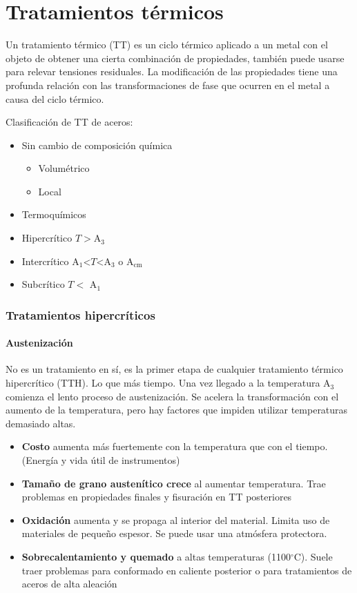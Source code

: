 \documentclass{article}
\newcommand{\Aone}{A\ensuremath{_{1}}}
\newcommand{\Athree}{A\ensuremath{_{3}}}
\newcommand{\Acm}{A\ensuremath{_{\mathrm{cm}}}}
\newcommand{\grad}{\ensuremath{^\circ \mathrm{C}}}
\begin{document}
\part{Tratamientos térmicos}
Un tratamiento térmico (TT) es un ciclo térmico aplicado a un metal con el objeto de obtener una cierta combinación de propiedades, también puede usarse para relevar tensiones residuales. La modificación de las propiedades tiene una profunda relación con las transformaciones de fase que ocurren en el metal a causa del ciclo térmico.

Clasificación de TT de aceros:
\begin{itemize}
    \item Sin cambio de composición química
    \begin{itemize}
        \item Volumétrico
        \item Local
    \end{itemize}
    \item Termoquímicos
    \item Hipercrítico $T>$\Athree
    \item Intercrítico \Aone<$T$<\Athree{} o \Acm
    \item Subcrítico $T<$ \Aone
\end{itemize}

\section{Tratamientos hipercríticos}

\subsection{Austenización}
No es un tratamiento en sí, es la primer etapa de cualquier tratamiento térmico hipercrítico (TTH). Lo que más tiempo. Una vez llegado a la temperatura \Athree{} comienza el lento proceso de austenización. Se acelera la transformación con el aumento de la temperatura, pero hay factores que impiden utilizar temperaturas demasiado altas.

\begin{itemize}
    \item \textbf{Costo} aumenta más fuertemente con la temperatura que con el tiempo. (Energía y vida útil de instrumentos)
    \item \textbf{Tamaño de grano austenítico crece} al aumentar temperatura. Trae problemas en propiedades finales y fisuración en TT posteriores
    \item \textbf{Oxidación} aumenta y se propaga al interior del material. Limita uso de materiales de pequeño espesor. Se puede usar una atmósfera protectora.
    \item \textbf{Sobrecalentamiento y quemado} a altas temperaturas (1100\grad). Suele traer problemas para conformado en caliente posterior o para tratamientos de aceros de alta aleación
\end{itemize}
\end{document}

